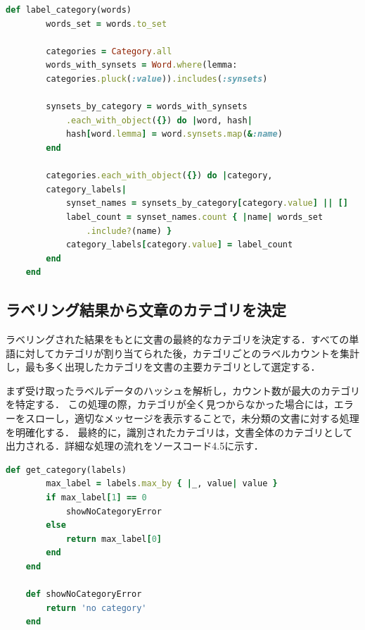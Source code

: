 \begin{lstlisting}[language=Ruby, caption=カテゴリのラベリングメソッド]
    def label_category(words)
        words_set = words.to_set

        categories = Category.all
        words_with_synsets = Word.where(lemma:
        categories.pluck(:value)).includes(:synsets)

        synsets_by_category = words_with_synsets
            .each_with_object({}) do |word, hash|
            hash[word.lemma] = word.synsets.map(&:name)
        end

        categories.each_with_object({}) do |category,
        category_labels|
            synset_names = synsets_by_category[category.value] || []
            label_count = synset_names.count { |name| words_set
                .include?(name) }
            category_labels[category.value] = label_count
        end
    end
\end{lstlisting}

\subsection{ラベリング結果から文章のカテゴリを決定}
\label{subsec:app_classify}

ラベリングされた結果をもとに文書の最終的なカテゴリを決定する．すべての単語に対してカテゴリが割り当てられた後，カテゴリごとのラベルカウントを集計し，最も多く出現したカテゴリを文書の主要カテゴリとして選定する．

まず受け取ったラベルデータのハッシュを解析し，カウント数が最大のカテゴリを特定する．
この処理の際，カテゴリが全く見つからなかった場合には，エラーをスローし，適切なメッセージを表示することで，未分類の文書に対する処理を明確化する．
最終的に，識別されたカテゴリは，文書全体のカテゴリとして出力される．詳細な処理の流れをソースコード4.5に示す．

\begin{lstlisting}[language=Ruby, caption=文書のカテゴリを決定するメソッド]
    def get_category(labels)
        max_label = labels.max_by { |_, value| value }
        if max_label[1] == 0
            showNoCategoryError
        else
            return max_label[0]
        end
    end

    def showNoCategoryError
        return 'no category'
    end
\end{lstlisting}
